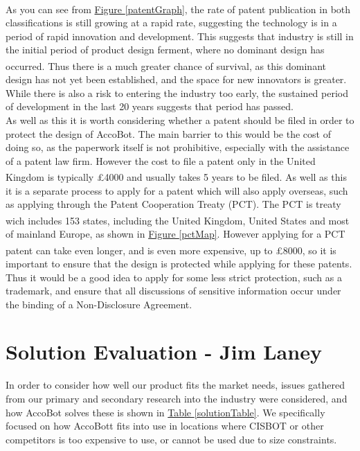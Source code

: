 \documentclass[11pt]{article}		%
\newcommand{\supercite}[1]{\textsuperscript{\cite{#1}}}		%
\newcommand{\figref}[1]{\hyperref[#1]{Figure \ref*{#1}}}    %
\newcommand{\tableref}[1]{\hyperref[#1]{Table \ref*{#1}}}     %
\begin{document}
		\\
		As you can see from \figref{patentGraph}, the rate of patent publication in both classifications is still growing at a rapid rate, suggesting the technology is in a period of rapid innovation and development.
		This suggests that industry is still in the initial period of product design ferment, where no dominant design has occurred\supercite{christensen1998innovation}.
		Thus there is a much greater chance of survival, as this dominant design has not yet been established, and the space for new innovators is greater.
		While there is also a risk to entering the industry too early, the sustained period of development in the last 20 years suggests that period has passed.
		\\
		As well as this it is worth considering whether a patent should be filed in order to protect the design of AccoBot.
		The main barrier to this would be the cost of doing so, as the paperwork itself is not prohibitive, especially with the assistance of a patent law firm.
		However the cost to file a patent only in the United Kingdom is typically £4000 and usually takes 5 years to be filed\supercite{uk2020patenting}.
		As well as this it is a separate process to apply for a patent which will also apply overseas, such as applying through the Patent Cooperation Treaty (PCT).
		The PCT is treaty wich includes 153 states\supercite{pct2020states}, including the United Kingdom, United States and most of mainland Europe, as shown in \figref{pctMap}.
		However applying for a PCT patent can take even longer, and is even more expensive, up to £8000\supercite{mewburn2020international}, so it is important to ensure that the design is protected while applying for these patents.
		Thus it would be a good idea to apply for some less strict protection, such as a trademark, and ensure that all discussions of sensitive information occur under the binding of a Non-Disclosure Agreement.
	
	\section[Solution Evaluation - EEM]{Solution Evaluation - Jim Laney}
	
		In order to consider how well our product fits the market needs, issues gathered from our primary and secondary research into the industry were considered, and how AccoBot solves these is shown in \tableref{solutionTable}.
		We specifically focused on how AccoBott fits into use in locations where CISBOT or other competitors is too expensive to use, or cannot be used due to size constraints. %
		
\end{document}
